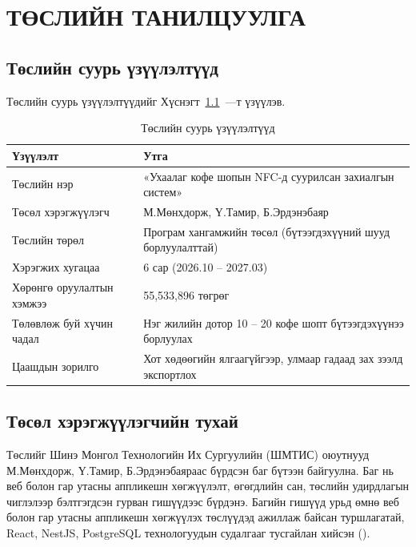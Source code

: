 \chapter{ТӨСЛИЙН ТАНИЛЦУУЛГА}

\section{Төслийн суурь үзүүлэлтүүд}

Төслийн суурь үзүүлэлтүүдийг Хүснэгт~\ref{tab:ch1-suur}~—т үзүүлэв.

\begin{table}[h]
  \centering
  \caption{Төслийн суурь үзүүлэлтүүд}
  \label{tab:ch1-suur}
  \begin{tabular}{@{}p{6.2cm}p{7.4cm}@{}}
    \toprule
    \textbf{Үзүүлэлт} & \textbf{Утга} \\ \midrule
    Төслийн нэр & «Ухаалаг кофе шопын NFC-д суурилсан захиалгын систем» \\
    Төсөл хэрэгжүүлэгч & М.Мөнхдорж, Ү.Тамир, Б.Эрдэнэбаяр \\
    Төслийн төрөл & Програм хангамжийн төсөл (бүтээгдэхүүний шууд
                      борлуулалттай) \\
    Хэрэгжих хугацаа & 6 сар (2026.10 -- 2027.03) \\
    Хөрөнгө оруулалтын хэмжээ & 55{,}533{,}896 төгрөг \\
    Төлөвлөж буй хүчин чадал & Нэг жилийн дотор 10 -- 20 кофе шопт
                               бүтээгдэхүүнээ борлуулах \\
    Цаашдын зорилго & Хот хөдөөгийн ялгаагүйгээр, улмаар гадаад зах зээлд
                      экспортлох \\
    \bottomrule
  \end{tabular}
\end{table}

\section{Төсөл хэрэгжүүлэгчийн тухай}

Төслийг Шинэ Монгол Технологийн Их Сургуулийн (ШМТИС) оюутнууд
М.Мөнхдорж, Ү.Тамир, Б.Эрдэнэбаяраас бүрдсэн баг бүтээн байгуулна. Баг
нь веб болон гар утасны аппликешн хөгжүүлэлт, өгөгдлийн сан, төслийн
удирдлагын чиглэлээр бэлтгэгдсэн гурван гишүүдээс бүрдэнэ. Багийн
гишүүд урьд өмнө веб болон гар утасны аппликешн хөгжүүлэх төслүүдэд
ажиллаж байсан туршлагатай, React, NestJS, PostgreSQL технологуудын
судалгааг тусгайлан хийсэн (\cite{react, nestjs, postgres}).

